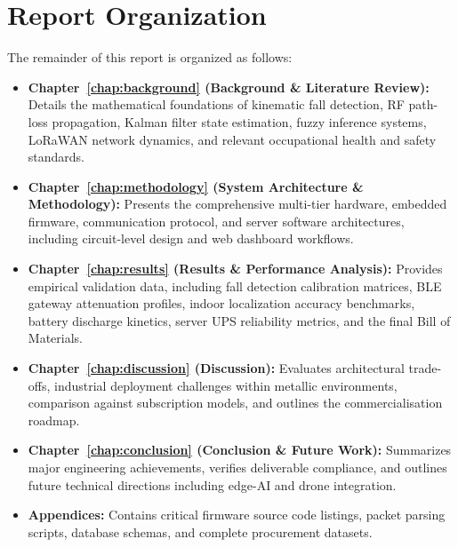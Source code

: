 \section{Report Organization}
The remainder of this report is organized as follows:
\begin{itemize}
    \item \textbf{Chapter~\ref{chap:background} (Background \& Literature Review):} Details the mathematical foundations of kinematic fall detection, RF path-loss propagation, Kalman filter state estimation, fuzzy inference systems, LoRaWAN network dynamics, and relevant occupational health and safety standards.
    \item \textbf{Chapter~\ref{chap:methodology} (System Architecture \& Methodology):} Presents the comprehensive multi-tier hardware, embedded firmware, communication protocol, and server software architectures, including circuit-level design and web dashboard workflows.
    \item \textbf{Chapter~\ref{chap:results} (Results \& Performance Analysis):} Provides empirical validation data, including fall detection calibration matrices, BLE gateway attenuation profiles, indoor localization accuracy benchmarks, battery discharge kinetics, server UPS reliability metrics, and the final Bill of Materials.
    \item \textbf{Chapter~\ref{chap:discussion} (Discussion):} Evaluates architectural trade-offs, industrial deployment challenges within metallic environments, comparison against subscription models, and outlines the commercialisation roadmap.
    \item \textbf{Chapter~\ref{chap:conclusion} (Conclusion \& Future Work):} Summarizes major engineering achievements, verifies deliverable compliance, and outlines future technical directions including edge-AI and drone integration.
    \item \textbf{Appendices:} Contains critical firmware source code listings, packet parsing scripts, database schemas, and complete procurement datasets.
\end{itemize}
